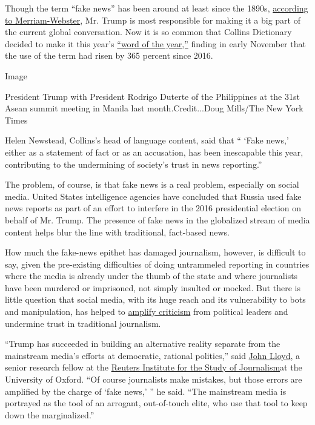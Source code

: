 Though the term ``fake news'' has been around at least since the 1890s,
\href{https://www.merriam-webster.com/words-at-play/the-real-story-of-fake-news}{according
to Merriam-Webster}, Mr. Trump is most responsible for making it a big
part of the current global conversation. Now it is so common that
Collins Dictionary decided to make it this year's
\href{http://www.independent.co.uk/news/uk/home-news/fake-news-word-of-the-year-2017-collins-dictionary-donald-trump-kellyanne-conway-antifa-corbynmania-a8032751.html}{``word
of the year,''} finding in early November that the use of the term had
risen by 365 percent since 2016.

Image

President Trump with President Rodrigo Duterte of the Philippines at the
31st Asean summit meeting in Manila last month.Credit...Doug Mills/The
New York Times

Helen Newstead, Collins's head of language content, said that `` `Fake
news,' either as a statement of fact or as an accusation, has been
inescapable this year, contributing to the undermining of society's
trust in news reporting.''

The problem, of course, is that fake news is a real problem, especially
on social media. United States intelligence agencies have concluded that
Russia used fake news reports as part of an effort to interfere in the
2016 presidential election on behalf of Mr. Trump. The presence of fake
news in the globalized stream of media content helps blur the line with
traditional, fact-based news.

How much the fake-news epithet has damaged journalism, however, is
difficult to say, given the pre-existing difficulties of doing
untrammeled reporting in countries where the media is already under the
thumb of the state and where journalists have been murdered or
imprisoned, not simply insulted or mocked. But there is little question
that social media, with its huge reach and its vulnerability to bots and
manipulation, has helped to
\href{https://www.nytimes3xbfgragh.onion/2016/12/25/us/politics/fake-news-claims-conservatives-mainstream-media-.html}{amplify
criticism} from political leaders and undermine trust in traditional
journalism.

``Trump has succeeded in building an alternative reality separate from
the mainstream media's efforts at democratic, rational politics,'' said
\href{https://reutersinstitute.politics.ox.ac.uk/people/john-lloyd}{John
Lloyd}, a senior research fellow at the
\href{https://reutersinstitute.politics.ox.ac.uk/}{Reuters Institute for
the Study of Journalism}at the University of Oxford. ``Of course
journalists make mistakes, but those errors are amplified by the charge
of `fake news,' '' he said. ``The mainstream media is portrayed as the
tool of an arrogant, out-of-touch elite, who use that tool to keep down
the marginalized.''

